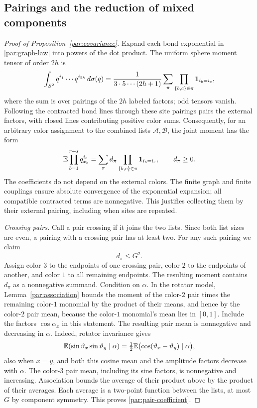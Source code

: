\subsection{Pairings and the reduction of mixed components}

\begin{proof}[Proof of Proposition~\ref{par:covariance}]
Expand each bond exponential in \eqref{par:graph-law} into powers of the
dot product. The uniform sphere moment tensor of order $2h$ is
\[
 \int_{S^2}q^{i_1}\cdots q^{i_{2h}}\,d\sigma(q)
 =\frac1{3\cdot5\cdots(2h+1)}
       \sum_{\pi}\prod_{\{b,c\}\in\pi}\mathbf 1_{i_b=i_c},
\]
where the sum is over pairings of the $2h$ labeled factors; odd tensors
vanish. Following the contracted bond lines through these site pairings
pairs the external factors, with closed lines contributing positive color
sums. Consequently, for an arbitrary color assignment to the combined
lists $\mathcal A,\mathcal B$, the joint moment has the form
\begin{equation}\label{par:pairings}
 \mathbb E\prod_{b=1}^{r+s}q_{x_b}^{i_b}
   =\sum_{\pi}d_\pi
       \prod_{\{b,c\}\in\pi}\mathbf 1_{i_b=i_c},
 \qquad d_\pi\ge0.
\end{equation}
The coefficients do not depend on the external colors. The finite graph
and finite couplings ensure absolute convergence of the exponential
expansion; all compatible contracted terms are nonnegative. This
justifies collecting them by their external pairing, including when sites
are repeated.

\emph{Crossing pairs.}
Call a pair crossing if it joins the two lists. Since both list sizes are
even, a pairing with a crossing pair has at least two. For any such
pairing we claim
\begin{equation}\label{par:pair-coefficient}
                         d_\pi\le G^2.
\end{equation}
Assign color $3$ to the endpoints of one crossing pair, color $2$ to the
endpoints of another, and color $1$ to all remaining endpoints. The
resulting moment contains $d_\pi$ as a nonnegative summand. Condition on
$\alpha$. In the rotator model, Lemma~\ref{par:association} bounds the
moment of the color-$2$ pair times the remaining color-$1$ monomial by
the product of their means, and hence by the color-$2$ pair mean, because
the color-$1$ monomial's mean lies in $[0,1]$. Include the factors
 $\cos\alpha_x$ in this statement. The resulting pair mean is nonnegative
and decreasing in $\alpha$. Indeed, rotator invariance gives
\[
 \mathbb E(\sin\vartheta_x\sin\vartheta_y\mid\alpha)
       =\tfrac12\mathbb E\bigl(\cos(\vartheta_x-\vartheta_y)\mid\alpha\bigr),
\]
also when $x=y$, and both this cosine mean and the amplitude factors
decrease with $\alpha$. The color-$3$ pair mean, including its
sine factors, is nonnegative and increasing. Association bounds the
average of their product above by the product of their averages. Each
average is a two-point function between the lists, at most $G$ by component
symmetry. This proves \eqref{par:pair-coefficient}.


\end{proof}
